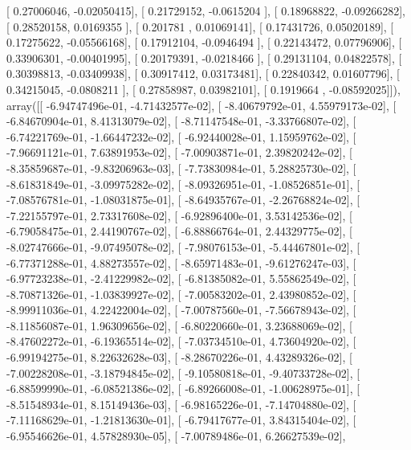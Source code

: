 \documentclass{article}
\begin{document}
       [ 0.27006046, -0.02050415],
       [ 0.21729152, -0.0615204 ],
       [ 0.18968822, -0.09266282],
       [ 0.28520158,  0.0169355 ],
       [ 0.201781  ,  0.01069141],
       [ 0.17431726,  0.05020189],
       [ 0.17275622, -0.05566168],
       [ 0.17912104, -0.0946494 ],
       [ 0.22143472,  0.07796906],
       [ 0.33906301, -0.00401995],
       [ 0.20179391, -0.0218466 ],
       [ 0.29131104,  0.04822578],
       [ 0.30398813, -0.03409938],
       [ 0.30917412,  0.03173481],
       [ 0.22840342,  0.01607796],
       [ 0.34215045, -0.0808211 ],
       [ 0.27858987,  0.03982101],
       [ 0.1919664 , -0.08592025]]), array([[ -6.94747496e-01,  -4.71432577e-02],
       [ -8.40679792e-01,   4.55979173e-02],
       [ -6.84670904e-01,   8.41313079e-02],
       [ -8.71147548e-01,  -3.33766807e-02],
       [ -6.74221769e-01,  -1.66447232e-02],
       [ -6.92440028e-01,   1.15959762e-02],
       [ -7.96691121e-01,   7.63891953e-02],
       [ -7.00903871e-01,   2.39820242e-02],
       [ -8.35859687e-01,  -9.83206963e-03],
       [ -7.73830984e-01,   5.28825730e-02],
       [ -8.61831849e-01,  -3.09975282e-02],
       [ -8.09326951e-01,  -1.08526851e-01],
       [ -7.08576781e-01,  -1.08031875e-01],
       [ -8.64935767e-01,  -2.26768824e-02],
       [ -7.22155797e-01,   2.73317608e-02],
       [ -6.92896400e-01,   3.53142536e-02],
       [ -6.79058475e-01,   2.44190767e-02],
       [ -6.88866764e-01,   2.44329775e-02],
       [ -8.02747666e-01,  -9.07495078e-02],
       [ -7.98076153e-01,  -5.44467801e-02],
       [ -6.77371288e-01,   4.88273557e-02],
       [ -8.65971483e-01,  -9.61276247e-03],
       [ -6.97723238e-01,  -2.41229982e-02],
       [ -6.81385082e-01,   5.55862549e-02],
       [ -8.70871326e-01,  -1.03839927e-02],
       [ -7.00583202e-01,   2.43980852e-02],
       [ -8.99911036e-01,   4.22422004e-02],
       [ -7.00787560e-01,  -7.56678943e-02],
       [ -8.11856087e-01,   1.96309656e-02],
       [ -6.80220660e-01,   3.23688069e-02],
       [ -8.47602272e-01,  -6.19365514e-02],
       [ -7.03734510e-01,   4.73604920e-02],
       [ -6.99194275e-01,   8.22632628e-03],
       [ -8.28670226e-01,   4.43289326e-02],
       [ -7.00228208e-01,  -3.18794845e-02],
       [ -9.10580818e-01,  -9.40733728e-02],
       [ -6.88599990e-01,  -6.08521386e-02],
       [ -6.89266008e-01,  -1.00628975e-01],
       [ -8.51548934e-01,   8.15149436e-03],
       [ -6.98165226e-01,  -7.14704880e-02],
       [ -7.11168629e-01,  -1.21813630e-01],
       [ -6.79417677e-01,   3.84315404e-02],
       [ -6.95546626e-01,   4.57828930e-05],
       [ -7.00789486e-01,   6.26627539e-02],
\end{document}
